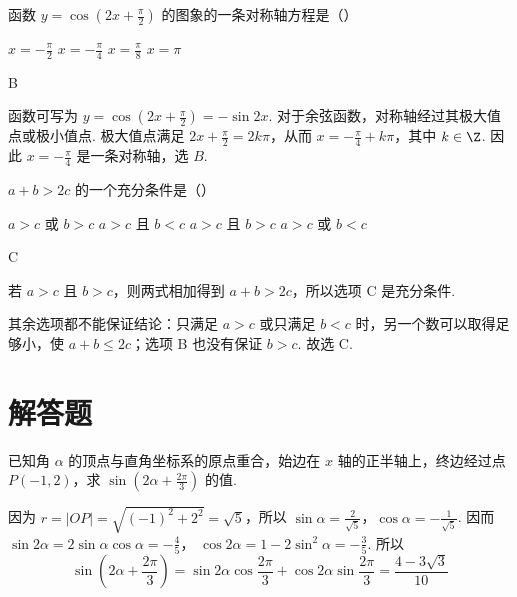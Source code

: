 \documentclass[UTF8,a4paper,oneside,11pt]{ctexbook}
\begin{document}
\begin{problem}
函数 \(y = \cos \left(2x + \frac{\pi}{2}\right) \) 的图象的一条对称轴方程是（\quad）

\choices
    {\(x = -\frac{\pi}{2}\)}
    {\(x = -\frac{\pi}{4}\)}
    {\(x = \frac{\pi}{8}\)}
    {\(x = \pi\)}
\end{problem}

\begin{answer}
B
\end{answer}

\begin{solution}
函数可写为 \(y=\cos\left(2x+\frac\pi2\right)=-\sin 2x\). 对于余弦函数，对称轴经过其极大值点或极小值点. 极大值点满足
\(2x+\frac\pi2=2k\pi\)，从而 \(x=-\frac\pi4+k\pi\)，其中 \(k\in\Z\). 因此 \(x=-\frac\pi4\) 是一条对称轴，选 \(B\).
\end{solution}

\begin{problem}
\(a + b > 2c\) 的一个充分条件是（\quad）

\choices
    {\(a > c\) 或 \(b > c\)}
    {\(a > c\) 且 \(b < c\)}
    {\(a > c\) 且 \(b > c\)}
    {\(a > c\) 或 \(b < c\)}
\end{problem}

\begin{answer}
C
\end{answer}

\begin{solution}
若 \(a>c\) 且 \(b>c\)，则两式相加得到 \(a+b>2c\)，所以选项 C 是充分条件.

其余选项都不能保证结论：只满足 \(a>c\) 或只满足 \(b<c\) 时，另一个数可以取得足够小，使 \(a+b\leqslant2c\)；选项 B 也没有保证 \(b>c\). 故选 C.
\end{solution}

\section{解答题}

\begin{problem}
已知角 \(\alpha\) 的顶点与直角坐标系的原点重合，始边在 \(x\) 轴的正半轴上，终边经过点 \(P(-1,2)\)，求 \(\sin \left(2\alpha + \frac{2\pi}{3}\right)\) 的值.
\end{problem}

\begin{solution}
因为 \(r = |OP| = \sqrt{(-1)^2 + 2^2} = \sqrt{5}\)，所以
\(\sin \alpha = \frac{2}{\sqrt{5}}\)，\(\cos \alpha = -\frac{1}{\sqrt{5}}\). 因而
\(\sin 2\alpha = 2\sin \alpha\cos \alpha = -\frac{4}{5}\)，
\(\cos 2\alpha = 1 - 2\sin^2\alpha = -\frac{3}{5}\). 所以
\[
\sin\left(2\alpha + \frac{2\pi}{3}\right)
= \sin 2\alpha\cos\frac{2\pi}{3} + \cos 2\alpha\sin\frac{2\pi}{3}
= \frac{4 - 3\sqrt{3}}{10}
\]
\end{solution}
\end{document}
